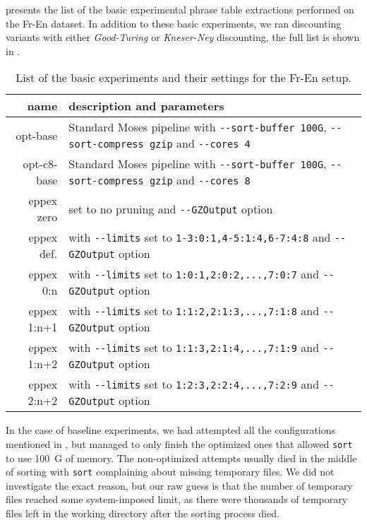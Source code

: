  presents the list of the basic experimental phrase table extractions
performed on the Fr-En dataset.
In addition to these basic experiments, we ran discounting variants with either
\emph{Good-Turing} or \emph{Kneser-Ney} discounting, the full list is shown in .

\begin{table}[ht]
\centering
\begin{tabular}{ r p{10cm} }
name & description and parameters \\
\hline
\hline
opt-base      & Standard Moses pipeline with \verb|--sort-buffer 100G|, \verb|--sort-compress gzip| and \verb|--cores 4| \\
opt-c8-base   & Standard Moses pipeline with \verb|--sort-buffer 100G|, \verb|--sort-compress gzip| and \verb|--cores 8| \\
eppex zero    & \eppex{} set to no pruning and \verb|--GZOutput| option \\
eppex def.    & \eppex{} with \verb|--limits| set to \verb|1-3:0:1,4-5:1:4,6-7:4:8| and \verb|--GZOutput| option \\
eppex 0:n     & \eppex{} with \verb|--limits| set to \verb|1:0:1,2:0:2,...,7:0:7| and \verb|--GZOutput| option \\
eppex 1:n+1   & \eppex{} with \verb|--limits| set to \verb|1:1:2,2:1:3,...,7:1:8| and \verb|--GZOutput| option \\
eppex 1:n+2   & \eppex{} with \verb|--limits| set to \verb|1:1:3,2:1:4,...,7:1:9| and \verb|--GZOutput| option \\
eppex 2:n+2   & \eppex{} with \verb|--limits| set to \verb|1:2:3,2:2:4,...,7:2:9| and \verb|--GZOutput| option \\
\hline
\hline
\end{tabular}
\caption{\label{fr-en-80-scenarios}
List of the basic experiments and their settings for the Fr-En setup.}
\end{table}

In the case of baseline experiments, we had attempted all the configurations mentioned
in , but managed to only finish the optimized ones
that allowed \texttt{sort} to use 100~G of memory.
The non-optimized attempts usually died in the middle of sorting with \texttt{sort} complaining
about missing temporary files.
We did not investigate the exact reason, but our raw guess is that the number of temporary
files reached some system-imposed limit, as there were thousands of temporary files left in
the working directory after the sorting process died.

